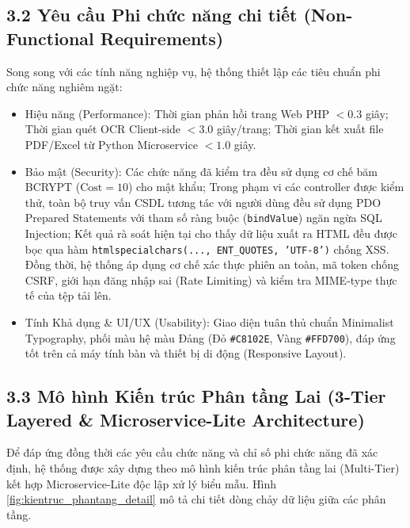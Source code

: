 \documentclass[12pt,a4paper]{report}
\begin{document}
\subsection*{3.2 Yêu cầu Phi chức năng chi tiết (Non-Functional Requirements)}
Song song với các tính năng nghiệp vụ, hệ thống thiết lập các tiêu chuẩn phi chức năng nghiêm ngặt:
\begin{itemize}[label=--,leftmargin=*]
  \item Hiệu năng (Performance): Thời gian phản hồi trang Web PHP $< 0.3$ giây; Thời gian quét OCR Client-side $< 3.0$ giây/trang; Thời gian kết xuất file PDF/Excel từ Python Microservice $< 1.0$ giây.
  \item Bảo mật (Security): Các chức năng đã kiểm tra đều sử dụng cơ chế băm BCRYPT ($\text{Cost}=10$) cho mật khẩu; Trong phạm vi các controller được kiểm thử, toàn bộ truy vấn CSDL tương tác với người dùng đều sử dụng PDO Prepared Statements với tham số ràng buộc (\texttt{bindValue}) ngăn ngừa SQL Injection; Kết quả rà soát hiện tại cho thấy dữ liệu xuất ra HTML đều được bọc qua hàm \texttt{htmlspecialchars(..., ENT\_QUOTES, 'UTF-8')} chống XSS. Đồng thời, hệ thống áp dụng cơ chế xác thực phiên an toàn, mã token chống CSRF, giới hạn đăng nhập sai (Rate Limiting) và kiểm tra MIME-type thực tế của tệp tải lên.
  \item Tính Khả dụng \& UI/UX (Usability): Giao diện tuân thủ chuẩn Minimalist Typography, phối màu hệ màu Đảng (Đỏ \texttt{\#C8102E}, Vàng \texttt{\#FFD700}), đáp ứng tốt trên cả máy tính bàn và thiết bị di động (Responsive Layout).
\end{itemize}

\subsection*{3.3 Mô hình Kiến trúc Phân tầng Lai (3-Tier Layered \& Microservice-Lite Architecture)}
Để đáp ứng đồng thời các yêu cầu chức năng và chỉ số phi chức năng đã xác định, hệ thống được xây dựng theo mô hình kiến trúc phân tầng lai (Multi-Tier) kết hợp Microservice-Lite độc lập xử lý biểu mẫu. Hình \ref{fig:kientruc_phantang_detail} mô tả chi tiết dòng chảy dữ liệu giữa các phân tầng.
\end{document}
